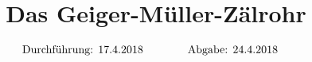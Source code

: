 

\subject{V703}
\title{Das Geiger-Müller-Zälrohr}

\date{
  \begin{align}
    \text{Durchführung: } & \text{17.4.2018} & \hspace{3em} & \text{Abgabe: 24.4.2018} \notag
  \end{align}
}




\maketitle
\thispagestyle{empty}
\tableofcontents
\newpage






\nocite{*}
\printbibliography{}



